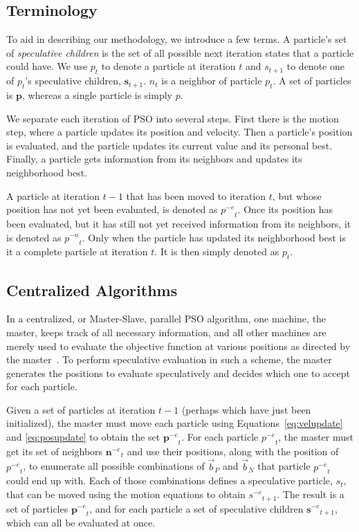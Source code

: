 \documentclass[conference,letterpaper]{IEEEtran}
\providecommand{\nbest}{\ensuremath{\Vec{b}_N}}
\providecommand{\pbest}{\ensuremath{\Vec{b}_P}}
\providecommand{\noeval}[1]{\ensuremath{#1^{-e}}}
\providecommand{\nonbest}[1]{\ensuremath{#1^{-n}}}
\providecommand{\p}{\ensuremath{p}}
\providecommand{\pset}{\ensuremath{\mathbf{p}}}
\providecommand{\s}{\ensuremath{s}}
\providecommand{\sset}{\ensuremath{\mathbf{s}}}
\providecommand{\n}{\ensuremath{n}}
\providecommand{\nset}{\ensuremath{\mathbf{n}}}
\begin{document}
\subsection{Terminology}

To aid in describing our methodology, we introduce a few terms.  A particle's
set of \emph{speculative children} is the set of all possible next iteration
states that a particle could have.  We use $\p_t$ to denote a particle at
iteration $t$ and $\s_{t+1}$ to denote one of $\p_t$'s speculative children,
$\sset_{t+1}$.  $\n_t$ is a neighbor of particle $\p_t$.  A set of particles is
$\pset$, whereas a single particle is simply $\p$.

We separate each iteration of PSO into several steps.  First there is the
motion step, where a particle updates its position and velocity.  Then a
particle's position is evaluated, and the particle updates its current value
and its personal best.  Finally, a particle gets information from its neighbors
and updates its neighborhood best.

A particle at iteration $t-1$ that has been moved to iteration $t$, but whose
position has not yet been evaluated, is denoted as $\noeval{\p}_t$.  Once its
position has been evaluated, but it has still not yet received information from
its neighbors, it is denoted as $\nonbest{\p}_t$.  Only when the particle has
updated its neighborhood best is it a complete particle at iteration $t$.  It is
then simply denoted as $\p_t$.

\subsection{Centralized Algorithms}

In a centralized, or Master-Slave, parallel PSO algorithm, one machine, the
master, keeps track of all necessary information, and all other machines are
merely used to evaluate the objective function at various positions as directed
by the master~\cite{belal-ijicis04}.  To perform speculative evaluation in such
a scheme, the master generates the positions to evaluate speculatively and
decides which one to accept for each particle.

Given a set of particles at iteration $t-1$ (perhaps which have just been
initialized), the master must move each particle using
Equations~\eqref{eq:velupdate} and \eqref{eq:posupdate} to obtain the set
$\noeval{\pset}_t$.  For each particle $\noeval{\p}_t$, the master must get its
set of neighbors $\noeval{\nset}_t$ and use their positions, along with the
position of $\noeval{\p}_t$, to enumerate all possible combinations of $\pbest$
and $\nbest$ that particle $\noeval{\p}_t$ could end up with.  Each of those
combinations defines a speculative particle, $\s_t$, that can be moved using
the motion equations to obtain $\noeval{\s}_{t+1}$.  The result is a set of
particles $\noeval{\pset}_t$, and for each particle a set of speculative
children $\noeval{\sset}_{t+1}$, which can all be evaluated at once.
\end{document}
